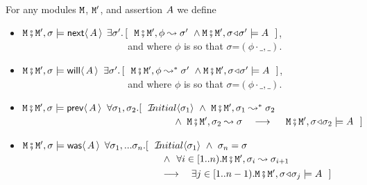 \begin{definition}  \label{def:valid:assertion:time}
For any modules $\M$, $\M'$, and assertion  $\A$ we define
  
\begin{itemize}
 \item
  $\M\mkpair \M', \sigma \models  \Next \A $
  \IFF
  $\exists \sigma'.\, [\ \ \M\mkpair \M',\phi \leadsto  \sigma' \ \wedge \M\mkpair \M',\sigma\adapt\sigma' \models \A \ \  ]$,
 \\
$\strut ~ \hspace{1.4in} $ \hfill  and where $\phi$ is
so that $\sigma$=$(\phi\cdot\_,\_)$.\item
  $\M\mkpair \M', \sigma \models  \Future \A $
  \IFF
  $\exists \sigma'.\, [\ \ \M\mkpair \M',\phi \leadsto^* \sigma' \ \wedge \M\mkpair \M',\sigma\adapt\sigma' \models \A \ \  ]$,
 \\
$\strut ~ \hspace{1.4in} $   \hfill   and where $\phi$ is
so that $\sigma$=$(\phi\cdot\_,\_)$.  
  \item
 $\M\mkpair \M', \sigma \models  \Prev \A $ \IFF
 $\forall \sigma_1, \sigma_2. [\ \ \Initial{\sigma_1}\ \wedge \   \M\mkpair \M', \sigma_1  \leadsto^*  \sigma_2 $\\
 $\strut ~ \hspace{2.1in}   \wedge \   \M\mkpair \M', \sigma_2  \leadsto   \sigma  
 \ \  \ \longrightarrow \ \ \   \
 \M\mkpair \M', \sigma\adapt\sigma_2  \models \A\ \
 ]$ 
 \item
 $\M\mkpair \M', \sigma \models  \Past \A $ \IFF
 $\forall \sigma_1, ... \sigma_n. [\ \ \Initial{\sigma_1}\ \wedge \  \sigma_n=\sigma $\\
 $\strut ~ \hspace{1.9in}   $   \hfill   $  \wedge \ \ \forall i\in[1..n). \M\mkpair \M', \sigma_{i} \leadsto  \sigma_{i+1}
$
 \\
$\strut ~ \hspace{1.9in} $   \hfill   $ \longrightarrow \ \ \  \exists j\in [1..n-1).
 \M\mkpair \M', \sigma\adapt\sigma_j  \models \A\ \
 ]$ 
\end{itemize}
\end{definition}

%
 
